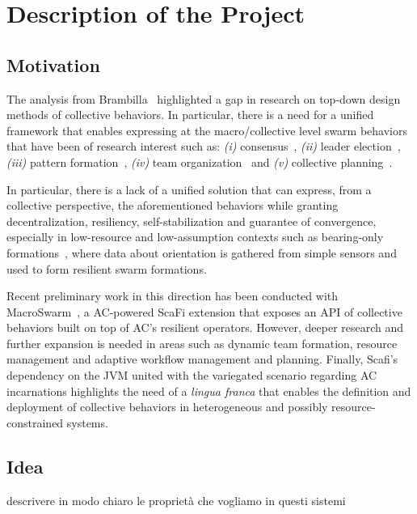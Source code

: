 \documentclass[12pt]{article}
\begin{document}
\section{Description of the Project}
\subsection{Motivation}
The analysis from Brambilla~\cite{brambilla2013swarm} highlighted a gap in research on top-down design methods of collective behaviors.
In particular, there is a need for a unified framework that enables expressing at the macro/collective level swarm behaviors that have
been of research interest such as:
\textit{(i)} consensus~\cite{valentini2017achieving}, \textit{(ii)} leader election~\cite{karpov2015leader}, \textit{(iii)} pattern formation~\cite{sahin2002swarm},
\textit{(iv)} team organization~\cite{nouyan2009teamwork} and \textit{(v)} collective planning~\cite{sampedro2016flexible}.

In particular, there is a lack of a unified solution that can express, from a collective perspective, the aforementioned behaviors while granting decentralization, 
resiliency, self-stabilization and guarantee of convergence, especially in low-resource and low-assumption contexts such as
bearing-only formations~\cite{zhao2021bearing}, where data about orientation is gathered from simple sensors and used to form resilient swarm formations.

Recent preliminary work in this direction has been conducted with MacroSwarm~\cite{aguzzi2023macroswarm}, a AC-powered ScaFi extension that exposes an API of collective
behaviors built on top of AC's resilient operators. However, deeper research and further expansion is needed in areas such as dynamic team formation, resource management and adaptive workflow management and planning.
Finally, Scafi's dependency on the JVM united with the variegated scenario regarding AC incarnations highlights the need of a \textit{lingua franca} that enables the definition and deployment
of collective behaviors in heterogeneous and possibly resource-constrained systems.

\subsection{Idea}

descrivere in modo chiaro le proprietà che vogliamo in questi sistemi
\end{document}
